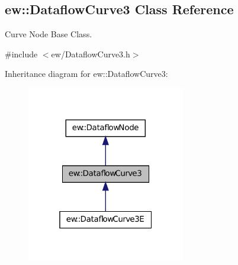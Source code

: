 \hypertarget{classew_1_1DataflowCurve3}{
\subsection{ew::DataflowCurve3 Class Reference}
\label{classew_1_1DataflowCurve3}
}


Curve Node Base Class.  




{\ttfamily \#include $<$ew/DataflowCurve3.h$>$}



Inheritance diagram for ew::DataflowCurve3:
\nopagebreak
\begin{figure}[H]
\begin{center}
\leavevmode
\includegraphics[width=196pt]{classew_1_1DataflowCurve3__inherit__graph}
\end{center}
\end{figure}
